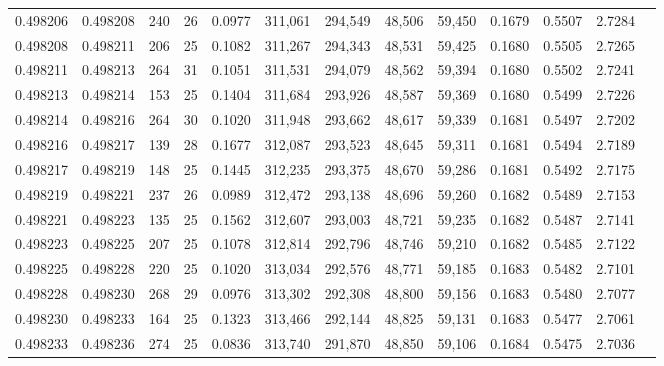 \begin{tabular}{rrrrrrrrrrrrr}
0.498206 & 0.498208 & 240 &  26 &                                     0.0977 & 311,061 & 294,549 &  48,506 &  59,450 & 0.1679 & 0.5507 & 2.7284 \\
0.498208 & 0.498211 & 206 &  25 &                                     0.1082 & 311,267 & 294,343 &  48,531 &  59,425 & 0.1680 & 0.5505 & 2.7265 \\
0.498211 & 0.498213 & 264 &  31 &                                     0.1051 & 311,531 & 294,079 &  48,562 &  59,394 & 0.1680 & 0.5502 & 2.7241 \\
0.498213 & 0.498214 & 153 &  25 &                                     0.1404 & 311,684 & 293,926 &  48,587 &  59,369 & 0.1680 & 0.5499 & 2.7226 \\
0.498214 & 0.498216 & 264 &  30 &                                     0.1020 & 311,948 & 293,662 &  48,617 &  59,339 & 0.1681 & 0.5497 & 2.7202 \\
0.498216 & 0.498217 & 139 &  28 &                                     0.1677 & 312,087 & 293,523 &  48,645 &  59,311 & 0.1681 & 0.5494 & 2.7189 \\
0.498217 & 0.498219 & 148 &  25 &                                     0.1445 & 312,235 & 293,375 &  48,670 &  59,286 & 0.1681 & 0.5492 & 2.7175 \\
0.498219 & 0.498221 & 237 &  26 &                                     0.0989 & 312,472 & 293,138 &  48,696 &  59,260 & 0.1682 & 0.5489 & 2.7153 \\
0.498221 & 0.498223 & 135 &  25 &                                     0.1562 & 312,607 & 293,003 &  48,721 &  59,235 & 0.1682 & 0.5487 & 2.7141 \\
0.498223 & 0.498225 & 207 &  25 &                                     0.1078 & 312,814 & 292,796 &  48,746 &  59,210 & 0.1682 & 0.5485 & 2.7122 \\
0.498225 & 0.498228 & 220 &  25 &                                     0.1020 & 313,034 & 292,576 &  48,771 &  59,185 & 0.1683 & 0.5482 & 2.7101 \\
0.498228 & 0.498230 & 268 &  29 &                                     0.0976 & 313,302 & 292,308 &  48,800 &  59,156 & 0.1683 & 0.5480 & 2.7077 \\
0.498230 & 0.498233 & 164 &  25 &                                     0.1323 & 313,466 & 292,144 &  48,825 &  59,131 & 0.1683 & 0.5477 & 2.7061 \\
0.498233 & 0.498236 & 274 &  25 &                                     0.0836 & 313,740 & 291,870 &  48,850 &  59,106 & 0.1684 & 0.5475 & 2.7036 \\

\end{tabular}
